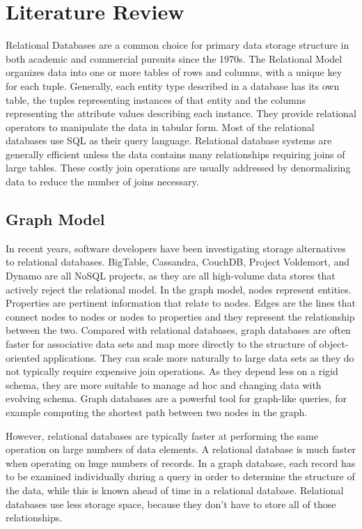 \documentclass[12pt, oneside]{book}
\begin{document}
\chapter{Literature Review}
Relational Databases are a common choice for primary data storage structure in both academic and commercial pursuits since the 1970s. The Relational Model organizes data into one or more tables of rows and columns, with a unique key for each tuple. Generally, each entity type described in a database has its own table, the tuples representing instances of that entity and the columns representing the attribute values describing each instance. They provide relational operators to manipulate the data in tabular form. Most of the relational databases use SQL as their query language. Relational database systems are generally efficient unless the data contains many relationships requiring joins of large tables. These costly join operations are usually addressed by denormalizing data to reduce the number of joins necessary.  
\section{Graph Model}
In recent years, software developers have been investigating storage alternatives to relational databases. BigTable, Cassandra, CouchDB, Project Voldemort, and Dynamo are all NoSQL projects, as they are all high-volume data stores that actively reject the relational model. In the graph model, nodes represent entities. Properties are pertinent information that relate to nodes. Edges are the lines that connect nodes to nodes or nodes to properties and they represent the relationship between the two. Compared with relational databases, graph databases are often faster for associative data sets and map more directly to the structure of object-oriented applications. They can scale more naturally to large data sets as they do not typically require expensive join operations. As they depend less on a rigid schema, they are more suitable to manage ad hoc and changing data with evolving schema. Graph databases are a powerful tool for graph-like queries, for example computing the shortest path between two nodes in the graph.\\
\par
However, relational databases are typically faster at performing the same operation on large numbers of data elements. A relational database is much faster when operating on huge numbers of records. In a graph database, each record has to be examined individually during a query in order to determine the structure of the data, while this is known ahead of time in a relational database. Relational databases use less storage space, because they don't have to store all of those relationships.
\end{document}
